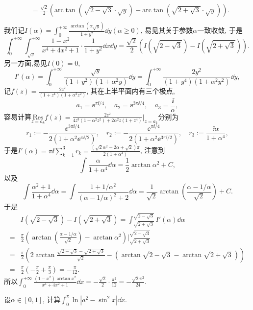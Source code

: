 \begin{quizb}
\begin{solution}
\[\begin{aligned}
	&=\frac{\sqrt{2}}{2}\left( \mathrm{arc}\tan \left( \sqrt{2-\sqrt{3}}\cdot \sqrt{y} \right) -\mathrm{arc}\tan \left( \sqrt{2+\sqrt{3}}\cdot \sqrt{y} \right) \right) .\\
\end{aligned}\]
我们记\(I(\alpha)=\int_{0}^{+\infty}\frac{\arctan\left(\alpha\sqrt{y}\right)}{1+y^2}\dd y(\alpha\geqslant 0)\), 易见其关于参数\(\alpha\)一致收敛,  于是\[\int_{0}^{+\infty}\int_{\sqrt{y}}^{+\infty}\frac{1-x^2}{x^4+4x^2+1}\cdot\frac{1}{1+y^2}\dd x\dd y=\frac{\sqrt{2}}{2}\left(I\left(\sqrt{2-\sqrt{3}}\right)-I\left(\sqrt{2+\sqrt{3}}\right)\right).\]
另一方面,易见\(I(0)=0\),\[I'(\alpha)=\int_{0}^{+\infty}\frac{\sqrt{y}}{(1+y^2)(1+\alpha^2y)}\dd y=\int_{0}^{+\infty}\frac{2y^2}{(1+y^4)(1+\alpha^2y^2)}\dd y,\]记\(f(z)=\frac{2z^2}{(1+z^4)(1+\alpha^2z^2)}\), 其在上半平面内有三个极点,\[a_1=\ee^{\pi\ii/4},\quad a_2=\ee^{3\pi\ii/4},\quad a_3=\frac{\ii}{\alpha},\]容易计算\(\underset{z=a_k}{\mathrm{Res}}f(z)=\frac{2z^2}{4z^3(1+\alpha^2z^2)+2\alpha^2z(1+z^4)}\Big|_{z=a_k}\)分别为\[r_1:=-\frac{\ee^{3\pi\ii/4}}{2\left(1+\alpha^2\ee^{\pi\ii/2}\right)},\quad r_2:=-\frac{\ee^{\pi\ii/4}}{2\left(1+\alpha^2\ee^{3\pi\ii/2}\right)},\quad r_3:=\frac{\ii\alpha}{1+\alpha^4},\]于是\(I'(\alpha)=\pi\ii\sum_{k=1}^{3}r_k=\frac{\left(\sqrt{2}\alpha^2-2\alpha+\sqrt{2}\right)\pi}{2(1+\alpha^4)}\), 注意到\[\int\frac{\alpha}{1+\alpha^4}\dd\alpha=\frac{1}{2}\arctan\alpha^2+C,\]以及\[\int\frac{\alpha^2+1}{1+\alpha^4}\dd\alpha=\int\frac{1+1/\alpha^2}{\left(\alpha-1/\alpha\right)^2+2}\dd\alpha=\frac{1}{\sqrt{2}}\arctan\left(\frac{\alpha-1/\alpha}{\sqrt{2}}\right)+C.\]
于是\[\begin{split}
&I\left(\sqrt{2-\sqrt{3}}\right)-I\left(\sqrt{2+\sqrt{3}}\right)=\int_{\sqrt{2+\sqrt{3}}}^{\sqrt{2-\sqrt{3}}}I'(\alpha)\dd\alpha\\
=&\frac{\pi}{2}\left(\arctan\left(\frac{\alpha-1/\alpha}{\sqrt{2}}\right)-\arctan\alpha^2\right)\Big|_{\sqrt{2+\sqrt{3}}}^{\sqrt{2-\sqrt{3}}}\\
=&\frac{\pi}{2}\left(2\arctan\frac{\sqrt{2-\sqrt{3}}-\sqrt{2+\sqrt{3}}}{\sqrt{2}}-\left(\arctan\sqrt{2-\sqrt{3}}-\arctan\sqrt{2+\sqrt{3}}\right)\right)\\
=&\frac{\pi}{2}\left(-\frac{\pi}{2}+\frac{\pi}{3}\right)=-\frac{\pi}{12}.
\end{split}\]
所以\(\int_{0}^{+\infty}\frac{(1-x^2)\arctan x^2}{x^4+4x^2+1}\dd x=-\frac{\sqrt{2}}{2}\cdot\frac{\pi^2}{12}=-\frac{\sqrt{2}\pi^2}{24}.\)
\end{solution}
\woe 设\(\alpha\in[0,1]\), 计算\(\int_{0}^{\pi}\ln|a^2-\sin^2x|\dd x.\)
\begin{solution}


\end{solution}
\end{quizb}
